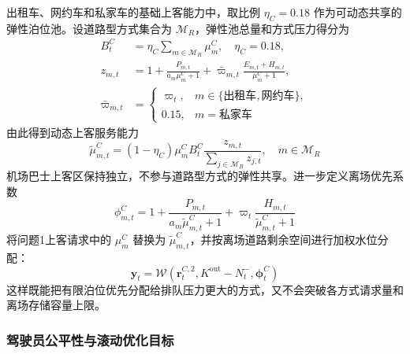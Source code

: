 \documentclass[UTF8,a4paper,11pt,onecolumn,fontset=none]{ctexart}
\begin{document}
出租车、网约车和私家车的基础上客能力中，取比例 $\eta_C=0.18$ 作为可动态共享的弹性泊位池。设道路型方式集合为 $\mathcal M_R$，弹性池总量和方式压力得分为
\begin{align}
  B_t^C
  &=\eta_C\sum_{m\in\mathcal M_R}\mu_m^C,
  \quad \eta_C=0.18,
  \label{eq:q2-curb-pool}\\
  z_{m,t}
  &=1+\frac{P_{m,t}}{a_m\mu_m^C+1}
  +\bar\varpi_{m,t}
  \frac{E_{m,t}+H_{m,t}}{\mu_m^C+1},
  \label{eq:q2-curb-score}\\
  \bar\varpi_{m,t}
  &=
  \begin{cases}
    \varpi_t, & m\in\{\text{出租车},\text{网约车}\},\\
    0.15, & m=\text{私家车}
  \end{cases}
  \label{eq:q2-mode-fairness-weight}
\end{align}
由此得到动态上客服务能力
\begin{equation}
  \widetilde\mu_{m,t}^{C}
  =(1-\eta_C)\mu_m^C
  B_t^C\frac{z_{m,t}}{\sum_{j\in\mathcal M_R}z_{j,t}},
  \quad m\in\mathcal M_R
  \label{eq:q2-dynamic-curb}
\end{equation}
机场巴士上客区保持独立，不参与道路型方式的弹性共享。进一步定义离场优先系数
\begin{equation}
  \phi_{m,t}^{C}
  =1+
  \frac{P_{m,t}}{a_m\widetilde\mu_{m,t}^C+1}
  +\varpi_t
  \frac{H_{m,t}}{\widetilde\mu_{m,t}^C+1}
  \label{eq:q2-exit-priority}
\end{equation}
将问题1上客请求中的 $\mu_m^C$ 替换为 $\widetilde\mu_{m,t}^C$，并按离场道路剩余空间进行加权水位分配：
\begin{equation}
  \boldsymbol y_t
  =\mathcal W
  \left(
  \boldsymbol r_t^{C,2},
  K^{\mathrm{out}}-N_t^{-},
  \boldsymbol\phi_t^C
  \right)
  \label{eq:q2-exit-waterfill}
\end{equation}
这样既能把有限泊位优先分配给排队压力更大的方式，又不会突破各方式请求量和离场存储容量上限。

\subsubsection{驾驶员公平性与滚动优化目标}
\end{document}
